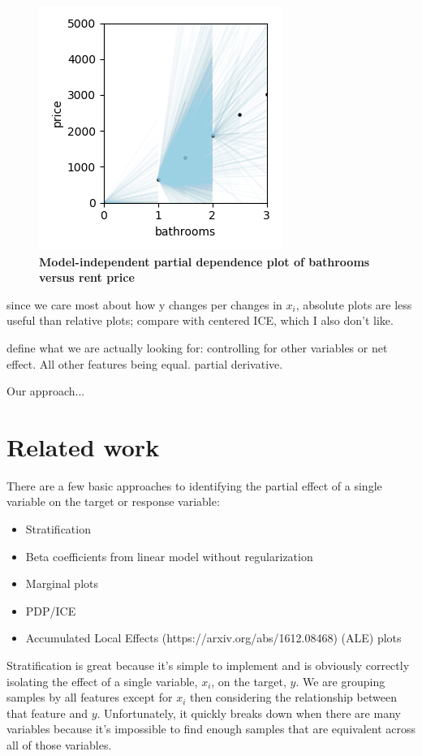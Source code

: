 \documentclass[12pt]{article}
\begin{document}
\begin{figure}[htbp]
\begin{center}
\includegraphics[scale=0.7]{images/baths_vs_price_mipd.png}
\caption{{\bf  Model-independent partial dependence plot of bathrooms versus rent price}}
\label{fig:baths_price_mipd}
\end{center}
\end{figure}

since we care most about how y changes per changes in $x_i$, absolute plots are less useful than relative plots; compare with centered ICE, which I also don't like.

define what we are actually looking for: controlling for other variables or net effect. All other features being equal. partial derivative.

Our approach...

\section{Related work}

There are a few basic approaches to identifying the partial effect of a single variable on the target or response variable:

\begin{itemize}
\item Stratification
\item Beta coefficients from linear model without regularization
\item Marginal plots
\item PDP/ICE
\item Accumulated Local Effects (https://arxiv.org/abs/1612.08468) (ALE) plots
\end{itemize}

Stratification is great because it's simple to implement and is obviously correctly isolating the effect of a single variable, $x_i$, on the target, $y$. We are grouping samples by all features except for $x_i$ then considering the relationship between that feature and $y$.   Unfortunately, it quickly breaks down when there are many variables because it's impossible to find enough samples that are equivalent across all of those variables.
\end{document}
